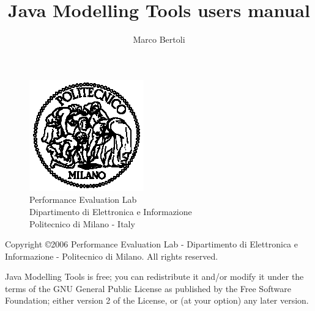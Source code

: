\documentclass[10pt, twoside, a4paper]{book}
\author{Marco Bertoli}
\title{Java Modelling Tools users manual}
\begin{document}
\pagestyle{headings}  \setcounter{page}{-1}

\begin{titlepage}
\begin{figure}[h]
\begin{center}
\includegraphics{img/poli}\\
Performance Evaluation Lab\\
Dipartimento di Elettronica e Informazione\\
Politecnico di Milano - Italy
\end{center}
\end{figure}
\newlength{\centeroffset}
\setlength{\centeroffset}{-0.5\oddsidemargin}
\addtolength{\centeroffset}{0.5\evensidemargin}

\noindent\hspace*{\centeroffset}

\noindent\hspace*{\centeroffset}




\pagebreak
\begin{small}
  Copyright \copyright 2006 Performance Evaluation Lab - Dipartimento
  di Elettronica e Informazione - Politecnico di Milano.
  All rights reserved.

  Java Modelling Tools is free; you can redistribute it and/or modify it
  under the terms of the GNU General Public License as published by
  the Free Software Foundation; either version 2 of the License, or
  (at your option) any later version.


\end{small}
\end{titlepage}
\end{document}
